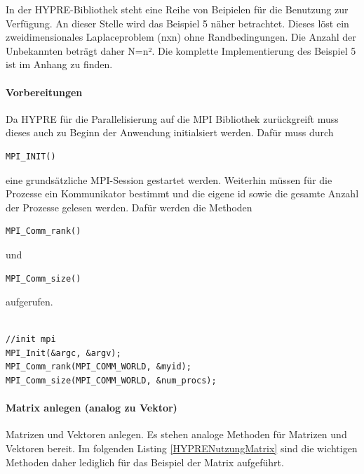 \documentclass[a4paper,10pt]{article}
\begin{document}
In der HYPRE-Bibliothek steht eine Reihe von Beipielen für die Benutzung zur Verfügung.
An dieser Stelle wird das Beispiel 5 näher betrachtet.
Dieses löst ein zweidimensionales Laplaceproblem (nxn) ohne Randbedingungen.
Die Anzahl der Unbekannten beträgt daher N=n².
Die komplette Implementierung des Beispiel 5 ist im Anhang zu finden.

\paragraph{Vorbereitungen}

Da HYPRE für die Parallelisierung auf die MPI Bibliothek zurückgreift muss dieses auch zu Beginn der Anwendung initialsiert werden.
Dafür muss durch \begin{verbatim}MPI_INIT()\end{verbatim} eine grundsätzliche MPI-Session gestartet werden.
Weiterhin müssen für die Prozesse ein Kommunikator bestimmt und die eigene id sowie die gesamte Anzahl der Prozesse gelesen werden.
Dafür werden die Methoden \begin{verbatim}MPI_Comm_rank()\end{verbatim} und \begin{verbatim}MPI_Comm_size()\end{verbatim} aufgerufen.

\begin{lstlisting}[frame=single,caption=HYPRE Nutzung: Vorbereitungen]

//init mpi
MPI_Init(&argc, &argv);
MPI_Comm_rank(MPI_COMM_WORLD, &myid);
MPI_Comm_size(MPI_COMM_WORLD, &num_procs);

\end{lstlisting}

\paragraph{Matrix anlegen (analog zu Vektor)}

Matrizen und Vektoren anlegen.
Es stehen analoge Methoden für Matrizen und Vektoren bereit.
Im folgenden Listing \ref{HYPRENutzungMatrix} sind die wichtigen Methoden daher lediglich für das Beispiel der Matrix aufgeführt.
\end{document}
